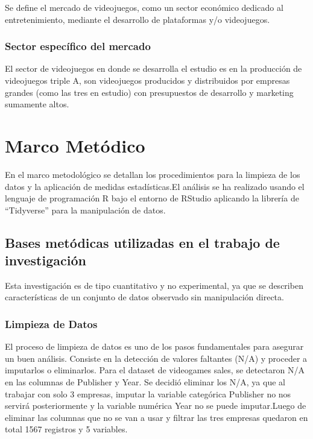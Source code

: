 \documentclass[oneside,11pt]{Latex/Classes/PhDthesisPSnPDF}
\begin{document}
Se define el mercado de videojuegos, como un sector económico dedicado
al entretenimiento, mediante el desarrollo de plataformas y/o
videojuegos.

\subsection{Sector específico del mercado}

El sector de videojuegos en donde se desarrolla el estudio es en la
producción de videojuegos triple A, son videojuegos producidos y
distribuidos por empresas grandes (como las tres en estudio) con
presupuestos de desarrollo y marketing sumamente altos.

\chapter{Marco Metódico}

En el marco metodológico se detallan los procedimientos para la limpieza
de los datos y la aplicación de medidas estadísticas.El análisis se ha
realizado usando el lenguaje de programación R bajo el entorno de
RStudio aplicando la librería de ``Tidyverse'' para la manipulación de
datos.

\section{Bases metódicas utilizadas en el trabajo de investigación}

Esta investigación es de tipo cuantitativo y no experimental, ya que se
describen características de un conjunto de datos observado sin
manipulación directa.

\subsection{Limpieza de Datos}

El proceso de limpieza de datos es uno de los pasos fundamentales para
asegurar un buen análisis. Consiste en la detección de valores faltantes
(N/A) y proceder a imputarlos o eliminarlos. Para el dataset de
videogames sales, se detectaron N/A en las columnas de Publisher y Year.
Se decidió eliminar los N/A, ya que al trabajar con solo 3 empresas,
imputar la variable categórica Publisher no nos servirá posteriormente y
la variable numérica Year no se puede imputar.Luego de eliminar las
columnas que no se van a usar y filtrar las tres empresas quedaron en
total 1567 registros y 5 variables.
\end{document}
